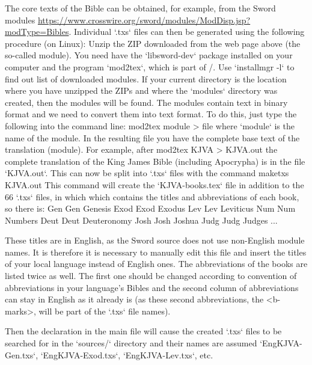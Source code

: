 {The core texts of the Bible can be obtained, for example, from the Sword modules 
\url{https://www.crosswire.org/sword/modules/ModDisp.jsp?modType=Bibles}.
Individual `.txs` files can then be generated using the following procedure (on Linux):
Unzip the ZIP downloaded from the  web page above (the so-called module). You need
have the `libsword-dev` package installed on your computer and the program
`mod2tex`, which is part of \OpBible/. Use `installmgr -l` to find out
list of downloaded modules. If your current directory is the location where you
have unzipped the ZIPs and where the `modules` directory was created, then the modules will be found. The modules contain text in binary format and we need 
to convert them into text format. To do this, just type the following into the command line: 
\begtt 
mod2tex module > file
\endtt 
where `module` is the name of the module. In the resulting file
you have the complete base text of the translation (module).
For example, after
\begtt
mod2tex KJVA > KJVA.out
\endtt
the complete translation of the King James Bible (including Apocrypha) is in the file `KJVA.out`.
This can now be split into `.txs` files with the command
\begtt
maketxs KJVA.out
\endtt
This command will create the `KJVA-books.tex` file in addition to the 66 `.txs` files, in which
which contains the titles and abbreviations of each book, so there is:
\begtt
\BookTitle Gen Gen {Genesis}
\BookTitle Exod Exod {Exodus}
\BookTitle Lev Lev {Leviticus}
\BookTitle Num Num  {Numbers}
\BookTitle Deut Deut {Deuteronomy}
\BookTitle Josh Josh {Joshua}
\BookTitle Judg Judg {Judges}
...
\endtt

These titles are in English, as the Sword source does not use non-English module names. 
It is therefore it is necessary to manually edit this file and insert the titles of your local language instead of English ones. 
The abbreviations of the books are listed twice as well. The first one should be changed according to convention of abbreviations in your language's Bibles and the second column of abbreviations can stay in English as it already is (as these second abbreviations, the <b-marks>, will be part of the `.txs` file names).  

Then the declaration 
\begtt
\def\txsfile {sources/Eng\tmark-\bmark.txs}
\endtt
in the main file will cause the created `.txs` files to be searched for 
in the `sources/` directory and their names are assumed
`EngKJVA-Gen.txs`, `EngKJVA-Exod.txs`, `EngKJVA-Lev.txs`, etc.

}
